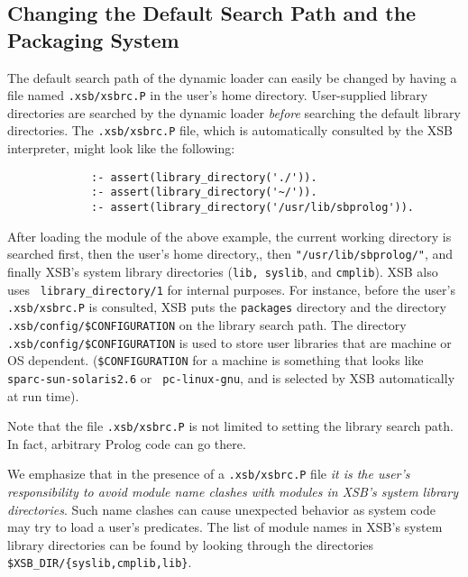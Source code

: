 \subsection{Changing the Default Search Path and the Packaging System}

The default search path of the dynamic loader can easily be changed by
having a file named {\verb|.xsb/xsbrc.P|} in the user's home
directory.  User-supplied library directories are searched by the
dynamic loader {\em before} searching the default library directories.
  The {\verb|.xsb/xsbrc.P|} file,
which is automatically consulted by the XSB interpreter, might look
like the following:
\begin{verbatim}
             :- assert(library_directory('./')).
             :- assert(library_directory('~/')).
             :- assert(library_directory('/usr/lib/sbprolog')).
\end{verbatim}
After loading the module of the above example, the current working
directory is searched first, then the user's home directory,, then
{\tt "/usr/lib/sbprolog/"}, and finally XSB's system library
directories ({\tt lib, syslib}, and {\tt cmplib}).  XSB also uses {\tt
library\_directory/1} for internal purposes.  For instance, before the
user's {\verb|.xsb/xsbrc.P|} is consulted, XSB puts the {\tt packages}
directory and the directory \verb|.xsb/config/$CONFIGURATION| on the
library search path.  The directory
\verb'.xsb/config/$CONFIGURATION' is used to store user libraries that
are machine or OS dependent. (\verb'$CONFIGURATION' for a machine is
something that looks like {\tt sparc-sun-solaris2.6} or {\tt
pc-linux-gnu}, and is selected by XSB automatically at run time).  

Note that the file {\verb|.xsb/xsbrc.P|} is not limited to setting the
library search path.  In fact, arbitrary Prolog code can go there.

We emphasize that in the presence of a {\verb|.xsb/xsbrc.P|} file {\em
it is the user's responsibility to avoid module name clashes with
modules in XSB's system library directories}.  Such name clashes can
cause unexpected behavior as system code may try to load a user's
predicates.  The list of module names in XSB's system library
directories can be found by looking through the directories {\tt
\$XSB\_DIR/\{syslib,cmplib,lib\}}.

